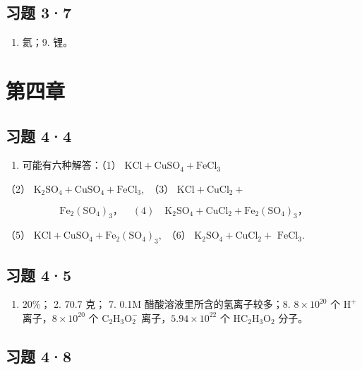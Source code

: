 \subsection{习题 3·7}

\begin{enumerate}[start=8]
\item
  氦；9. 锂。
\end{enumerate}

\section{第四章}

\subsection{习题 4·4}

\begin{enumerate}[start=8]
\item
  可能有六种解答：（1）
  \(\mathrm{KCl} + \mathrm{CuSO}_4 + \mathrm{FeCl}_3\)
\end{enumerate}

（2） \(\mathrm{K}_2\mathrm{SO}_4 + \mathrm{CuSO}_4 + \mathrm{FeCl}_3,\)
（3） \(\mathrm{KCl} + \mathrm{CuCl}_2 +\)

\[
\mathrm{Fe} _ {2} (\mathrm{SO} _ {4}) _ {3}\text{，} \quad (4) \quad \mathrm{K} _ {2} \mathrm{SO} _ {4} + \mathrm{CuCl} _ {2} + \mathrm{Fe} _ {2} (\mathrm{SO} _ {4}) _ {3}\text{，}
\]

（5）
\(\mathrm{KCl} + \mathrm{CuSO}_4 + \mathrm{Fe}_2(\mathrm{SO}_4)_3,\)
（6） \(\mathrm{K}_2\mathrm{SO}_4 + \mathrm{CuCl}_2 +\)
\(\mathrm{FeCl}_3.\)

\subsection{习题 4·5}

\begin{enumerate}
\item
  20\%； 2. 70.7 克； 7. 0.1M 醋酸溶液里所含的氢离子较多；8.
  \(8\times10^{20}\) 个 \(\mathrm{H}^+\) 离子，\(8\times10^{20}\) 个
  \(\mathrm{C_2H_3O_2^-}\) 离子，\(5.94\times10^{22}\) 个
  \(\mathrm{HC_2H_3O_2}\) 分子。
\end{enumerate}

\subsection{习题 4·8}

